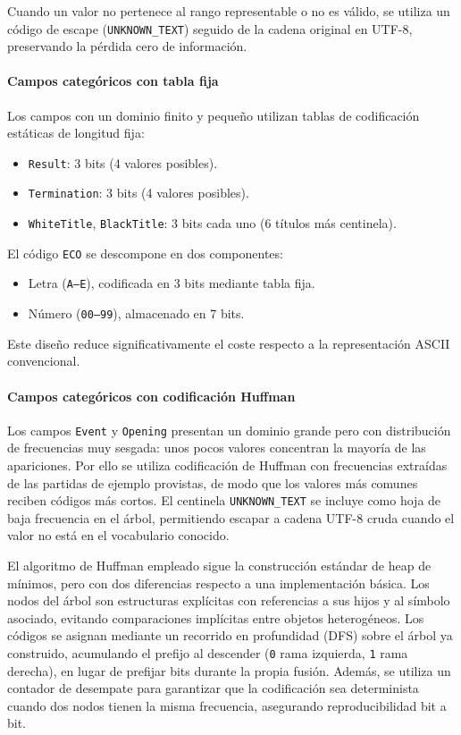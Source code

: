 \documentclass[11pt, letterpaper]{article}
\begin{document}
Cuando un valor no pertenece al rango representable o no es válido, se utiliza un código de escape (\texttt{UNKNOWN\_TEXT}) seguido de la cadena original en UTF-8, preservando la pérdida cero de información.

\paragraph{Campos categóricos con tabla fija}
Los campos con un dominio finito y pequeño utilizan tablas de codificación estáticas de longitud fija:

\begin{itemize}
    \item \texttt{Result}: 3 bits (4 valores posibles).
    \item \texttt{Termination}: 3 bits (4 valores posibles).
    \item \texttt{WhiteTitle}, \texttt{BlackTitle}: 3 bits cada uno (6 títulos más centinela).
\end{itemize}

El código \texttt{ECO} se descompone en dos componentes:

\begin{itemize}
    \item Letra (\texttt{A--E}), codificada en 3 bits mediante tabla fija.
    \item Número (\texttt{00--99}), almacenado en 7 bits.
\end{itemize}

Este diseño reduce significativamente el coste respecto a la representación ASCII convencional.

\paragraph{Campos categóricos con codificación Huffman}
Los campos \texttt{Event} y \texttt{Opening} presentan un dominio grande pero con distribución de frecuencias muy sesgada: unos pocos valores concentran la mayoría de las apariciones. Por ello se utiliza codificación de Huffman con frecuencias extraídas de las partidas de ejemplo provistas, de modo que los valores más comunes reciben códigos más cortos. El centinela \texttt{UNKNOWN\_TEXT} se incluye como hoja de baja frecuencia en el árbol, permitiendo escapar a cadena UTF-8 cruda cuando el valor no está en el vocabulario conocido.

El algoritmo de Huffman empleado sigue la construcción estándar de heap de mínimos, pero con dos diferencias respecto a una implementación básica. Los nodos del árbol son estructuras explícitas con referencias a sus hijos y al símbolo asociado, evitando comparaciones implícitas entre objetos heterogéneos. Los códigos se asignan mediante un recorrido en profundidad (DFS) sobre el árbol ya construido, acumulando el prefijo al descender (\texttt{0} rama izquierda, \texttt{1} rama derecha), en lugar de prefijar bits durante la propia fusión. Además, se utiliza un contador de desempate para garantizar que la codificación sea determinista cuando dos nodos tienen la misma frecuencia, asegurando reproducibilidad bit a bit.
\end{document}
